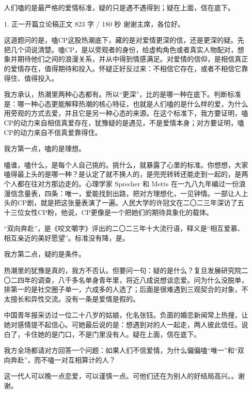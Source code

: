 \documentclass[script,pro]{debate}
\begin{document}
\debatetitle
\begin{thesisbox}[全场一句话立论]人们嗑的是最严格的爱情标准，疑的只是遇不遇得到；疑在上面，信在底下。\end{thesisbox}

\begin{speech}{1. 正一开篇立论稿}{正文 823 字 / 180 秒}
谢谢主席，各位好。

这道题问的是，嗑CP这股热潮底下，藏的是对爱情更深的信，还是更深的疑。先把几个词说清楚。嗑CP，是以旁观者的身份，给虚构角色或者真实人物配对，想象并期待他们之间的浪漫关系，并从中得到情感满足。对爱情的信仰，是相信真正的爱情存在，值得期待和投入。怀疑正好反过来：不相信它存在，或者不相信它靠得住、值得投入。

我方承认，热潮里两种心态都有。所以“更深”，比的是哪一种在底下。判断标准是：哪一种心态更能解释热潮的核心特征，也就是人们嗑的是什么样的爱，为什么用旁观的方式去爱，并且它是另一种心态的来源。在这个标准下，我方要证明，嗑CP的动力来自相信真爱存在，犹豫疑的是遇见，不是爱情本身；对方要证明，嗑CP的动力来自不信真爱靠得住。

我方第一点，嗑的是理想。

嗑谁，嗑什么，是每个人自己挑的。挑什么，就暴露了心里的标准。你想想，大家嗑得最上头的是哪一种？是认定了就不换人的，是兜兜转转还能走到一起的，是两个人都在往对方那边走的。心理学家 Sprecher 和 Metts 在一九八九年编过一份浪漫信念量表，四条：唯一，爱能找到出路，把对方理想化，一见钟情。一部让人上头的CP剧，就是把这张量表演了一遍。人民大学的许冠文在二〇二三年深访了五十三位女性CP粉，他说，CP更像是一个把她们的期待具象化的载体。

“双向奔赴”，是《咬文嚼字》评出的二〇二三年十大流行语，释义是“相互爱慕、相互亲近的美好愿望”。标准没有降，是。

我方第二点，疑的是条件。

热潮里的犹豫是真的，我方不否认。但要问一句：疑的是什么？复旦发展研究院二〇二四年的调查，八千多名单身青年里，将近八成说想谈恋爱。问为什么没脱单，排第一的是社交圈子单一，六成多的人选了；后面是很难遇到三观契合的对象，不太擅长和异性交流。没有一条是爱情是假的。

中国青年报采访过一位二十八岁的姑娘，化名张钰。负面的婚恋新闻常上热搜，让她对感情提不起信心。可她最后说的是：想遇到对的人一起走，两人彼此信任。说白了，卡住她的是门口，不是门里没有人。疑在上面，信在底下。

我方全场都请对方回答一个问题：如果人们不信爱情，为什么偏偏嗑“唯一”和“双向奔赴”，而不嗑一对互相算计的人？

这一代人可以晚一点恋爱，可以谨慎一点。可他们还在为别人的好结局高兴。。谢谢。
\end{speech}
\begin{contingency}
\end{contingency}
\end{document}
